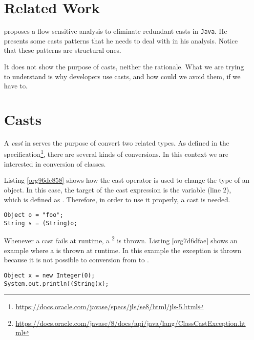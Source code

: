 \section{Related Work}
\label{sec:org255eb70}
\cite{winther_guarded_2011} proposes a flow-sensitive analysis to eliminate
redundant casts in \texttt{Java}.
He presents some casts patterns that he needs to deal with in his analysis.
Notice that these patterns are structural ones.

\cite{staicu_understanding_2017}

\cite{buse_synthesizing_2012}

It does not show the purpose of casts, neither the rationale.
What we are trying to understand is why developers use casts,
and how could we avoid them, if we have to.

\section{Casts \label{org9cc9cb6}}
\label{sec:org6ed331e}
A \emph{cast} in \java{} serves the purpose of convert two related types. 
As defined in the \java{} specification\footnote{\url{https://docs.oracle.com/javase/specs/jls/se8/html/jls-5.html}}, there are several kinds of conversions. 
In this context we are interested in conversion of classes. 

Listing \ref{org96de858} shows how the cast operator is used to change the type of an object. 
In this case, the target of the cast expression is the variable  (line 2), which is defined as . 
Therefore, in order to use it properly, a cast is needed. 

\begin{lstlisting}
Object o = "foo"; 
String s = (String)o; 
\end{lstlisting}

Whenever a cast fails at runtime, a \cce{} \footnote{\url{https://docs.oracle.com/javase/8/docs/api/java/lang/ClassCastException.html}} is thrown. 
Listing \ref{org7d6dfae} shows an example where a \cce{} is thrown at runtime. 
In this example the exception is thrown because it is not possible to conversion from  to . 

\begin{lstlisting}
Object x = new Integer(0); 
System.out.println((String)x); 
\end{lstlisting}

